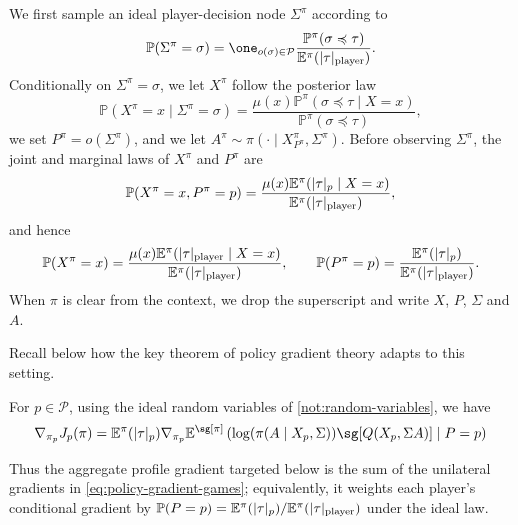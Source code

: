 \documentclass[12pt, a4paper]{article}
\begin{document}
\begin{notation}\label{not:random-variables}
We first sample an ideal player-decision node $\Sigma^\pi$ according to
\begin{equation}\label{eq:stationary-node-law}
  \mathbb{P}(\Sigma^\pi = \sigma)
  = \one_{o(\sigma)\in\mathcal P}
  \frac{\mathbb{P}^\pi(\sigma \preccurlyeq \tau)}
       {\mathbb{E}^\pi(|\tau|_{\textnormal{player}})}.
\end{equation}
Conditionally on $\Sigma^\pi=\sigma$, we let $X^\pi$ follow the posterior law
\begin{equation}\label{eq:ideal-private-profile-law}
  \mathbb{P}(X^\pi=x\mid\Sigma^\pi=\sigma)
  =
  \frac{\mu(x)\mathbb{P}^\pi(\sigma\preccurlyeq\tau\mid X=x)}
       {\mathbb{P}^\pi(\sigma\preccurlyeq\tau)},
\end{equation}
we set $P^\pi=o(\Sigma^\pi)$, and we let
$A^\pi\sim\pi(\cdot\mid X^\pi_{P^\pi},\Sigma^\pi)$.
Before observing $\Sigma^\pi$, the joint and marginal laws of $X^\pi$ and $P^\pi$ are
\begin{equation}\label{eq:ideal-profile-player-law}
  \mathbb{P}(X^\pi=x,P^\pi=p)
  = \frac{\mu(x)\mathbb{E}^\pi(|\tau|_p\mid X=x)}
           {\mathbb{E}^\pi(|\tau|_{\textnormal{player}})},
\end{equation}
and hence
\begin{equation}\label{eq:ideal-profile-and-player-marginals}
  \mathbb{P}(X^\pi=x)
  = \frac{\mu(x)\mathbb{E}^\pi(|\tau|_{\textnormal{player}}\mid X=x)}
           {\mathbb{E}^\pi(|\tau|_{\textnormal{player}})},
  \qquad
  \mathbb{P}(P^\pi=p)
  = \frac{\mathbb{E}^\pi(|\tau|_p)}
           {\mathbb{E}^\pi(|\tau|_{\textnormal{player}})}.
\end{equation}
When $\pi$ is clear from the context, we drop the superscript and write $X$, $P$, $\Sigma$ and $A$.
\end{notation}

Recall below how the key theorem of policy gradient theory adapts to this setting.

\begin{theorem}\label{thm:policy-gradient-games}
  For $p \in \mathcal{P}$, using the ideal random variables of \autoref{not:random-variables}, we have
  \begin{equation}\label{eq:policy-gradient-games}
    \nabla_{\pi_p} J_p(\pi)
    = \mathbb{E}^\pi(|\tau|_{p}) \nabla_{\pi_p} \mathbb{E}^{\sg[\pi]}\left(\log(\pi(A \mid X_p, \Sigma)) \sg[Q(X_p, \Sigma A)] \mid P = p\right)
  \end{equation}
\end{theorem}
Thus the aggregate profile gradient targeted below is the sum of the unilateral gradients in \autoref{eq:policy-gradient-games}; equivalently, it weights each player's conditional gradient by $\mathbb P(P=p)=\mathbb E^\pi(|\tau|_p)/\mathbb E^\pi(|\tau|_{\textnormal{player}})$ under the ideal law.
\end{document}

